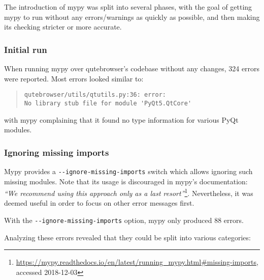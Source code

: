 The introduction of mypy was split into several phases, with the goal of getting
mypy to run without any errors/warnings as quickly as possible, and then making
its checking stricter or more accurate.

\subsubsection{Initial run}
When running mypy over qutebrowser's codebase without any changes, 324 errors
were reported. Most errors looked similar to:

\begin{quote}
\begin{verbatim}
qutebrowser/utils/qtutils.py:36: error:
No library stub file for module 'PyQt5.QtCore'
\end{verbatim}
\end{quote}

with mypy complaining that it found no type information for various PyQt
modules.

\subsubsection{Ignoring missing imports}

Mypy provides a \verb|--ignore-missing-imports| switch which allows ignoring
such missing modules. Note that its usage is discouraged in mypy's documentation:
\emph{``We recommend using this approach only as a last resort''}\footnote{\url{https://mypy.readthedocs.io/en/latest/running_mypy.html\#missing-imports},
accessed 2018-12-03}. Nevertheless, it was deemed useful in order to focus on
other error messages first.

With the \verb|--ignore-missing-imports| option, mypy only produced 88 errors.

Analyzing these errors revealed that they could be split into various
categories:

